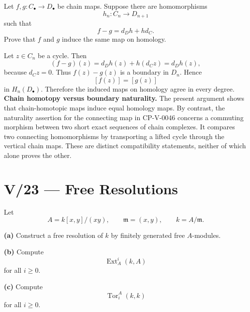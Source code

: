 \begin{problem}[CP-V-0110]
\label{prob:cp-v-0110}
Let \(f,g:C_\bullet\to D_\bullet\) be chain maps. Suppose there are homomorphisms
\[
h_n:C_n\to D_{n+1}
\]
such that
\[
f-g=d_Dh+hd_C.
\]
Prove that \(f\) and \(g\) induce the same map on homology.
\end{problem}

\begin{solution}
Let \(z\in C_n\) be a cycle. Then
\[
(f-g)(z)=d_Dh(z)+h(d_Cz)=d_Dh(z),
\]
because \(d_Cz=0\). Thus \(f(z)-g(z)\) is a boundary in \(D_n\). Hence
\[
[f(z)]=[g(z)]
\]
in \(H_n(D_\bullet)\). Therefore the induced maps on homology agree in every degree.
\medskip
\noindent\textbf{Chain homotopy versus boundary naturality.}
The present argument shows that chain-homotopic maps induce equal
homology maps. By contrast, the naturality assertion for the connecting
map in CP-V-0046 concerns a commuting morphism between two short exact
sequences of chain complexes. It compares two connecting homomorphisms
by transporting a lifted cycle through the vertical chain maps.
These are distinct compatibility statements, neither of which alone
proves the other.

\end{solution}



\section*{V/23 --- Free Resolutions}

\begin{problem}[CP-V-0041]
\label{prob:cp-v-0041}
Let
\[
A=k[x,y]/(xy),
\qquad
\mathfrak m=(x,y),
\qquad
k=A/\mathfrak m.
\]

\textbf{(a)} Construct a free resolution of \(k\) by finitely generated free
\(A\)-modules.

\textbf{(b)} Compute
\[
\operatorname{Ext}_A^i(k,A)
\]
for all \(i\ge0\).

\textbf{(c)} Compute
\[
\operatorname{Tor}_i^A(k,k)
\]
for all \(i\ge0\).
\end{problem}

